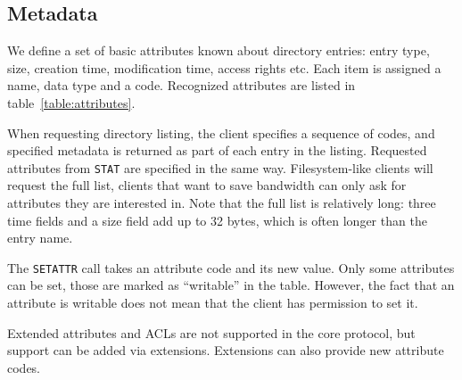 %

\subsection{Metadata}

We define a set of basic attributes known about directory entries: entry type, size, creation time,
modification time, access rights etc. Each item is assigned a name, data type and a code. Recognized
attributes are listed in table~\ref{table:attributes}.

When requesting directory listing, the client specifies a sequence of codes, and specified metadata is
returned as part of each entry in the listing. Requested attributes from {\tt STAT} are specified in the same
way. Filesystem-like clients will request the full list, clients that want to save bandwidth can only ask for
attributes they are interested in.  Note that the full list is relatively long: three time fields and a size
field add up to 32 bytes, which is often longer than the entry name.

The {\tt SETATTR} call takes an attribute code and its new value. Only some attributes can be set, those are
marked as ``writable'' in the table. However, the fact that an attribute is writable does not mean that the
client has permission to set it.

Extended attributes and ACLs are not supported in the core protocol, but support can be added via extensions.
Extensions can also provide new attribute codes.

